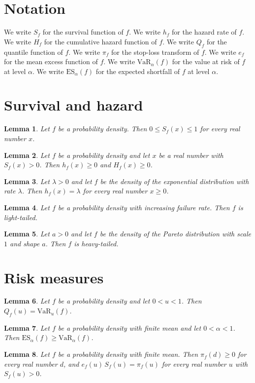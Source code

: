 \documentclass{article}
\newtheorem{lemma}{Lemma}
\begin{document}
\section{Notation}

We write $S_f$ for the survival function of $f$.
We write $h_f$ for the hazard rate of $f$.
We write $H_f$ for the cumulative hazard function of $f$.
We write $Q_f$ for the quantile function of $f$.
We write $\pi_f$ for the stop-loss transform of $f$.
We write $e_f$ for the mean excess function of $f$.
We write $\mathrm{VaR}_\alpha(f)$ for the value at risk of $f$ at level $\alpha$.
We write $\mathrm{ES}_\alpha(f)$ for the expected shortfall of $f$ at level $\alpha$.

\section{Survival and hazard}

\begin{lemma}\label{survival}
Let $f$ be a probability density. Then $0\le S_f(x)\le1$ for every real number $x$.
\end{lemma}

\begin{lemma}\label{hazard}
Let $f$ be a probability density and let $x$ be a real number with $S_f(x)>0$. Then $h_f(x)\ge0$ and $H_f(x)\ge0$.
\end{lemma}

\begin{lemma}\label{exponential}
Let $\lambda>0$ and let $f$ be the density of the exponential distribution with rate $\lambda$. Then $h_f(x)=\lambda$ for every real number $x\ge0$.
\end{lemma}

\begin{lemma}\label{ifr}
Let $f$ be a probability density with increasing failure rate. Then $f$ is light-tailed.
\end{lemma}

\begin{lemma}\label{pareto}
Let $a>0$ and let $f$ be the density of the Pareto distribution with scale $1$ and shape $a$. Then $f$ is heavy-tailed.
\end{lemma}

\section{Risk measures}

\begin{lemma}\label{quantile}
Let $f$ be a probability density and let $0<u<1$. Then $Q_f(u)=\mathrm{VaR}_u(f)$.
\end{lemma}

\begin{lemma}\label{shortfall}
Let $f$ be a probability density with finite mean and let $0<\alpha<1$. Then $\mathrm{ES}_\alpha(f)\ge\mathrm{VaR}_\alpha(f)$.
\end{lemma}

\begin{lemma}\label{stoploss}
Let $f$ be a probability density with finite mean. Then $\pi_f(d)\ge0$ for every real number $d$, and $e_f(u)\,S_f(u)=\pi_f(u)$ for every real number $u$ with $S_f(u)>0$.
\end{lemma}
\end{document}
